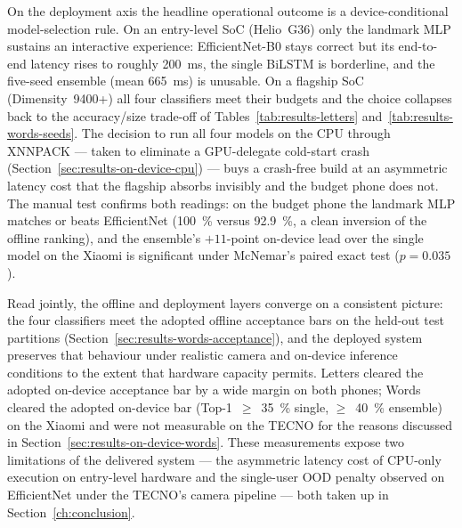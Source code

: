 On the deployment axis the headline operational outcome is a
device-conditional model-selection rule. On an entry-level SoC
(Helio~G36) only the landmark MLP sustains an interactive experience:
EfficientNet-B0 stays correct but its end-to-end latency rises to
roughly \SI{200}{ms}, the single BiLSTM is borderline, and the
five-seed ensemble (mean \SI{665}{ms}) is unusable. On a flagship SoC
(Dimensity~9400+) all four classifiers meet their budgets and the
choice collapses back to the accuracy/size trade-off of
Tables~\ref{tab:results-letters} and~\ref{tab:results-words-seeds}.
The decision to run all four models on the CPU through XNNPACK ---
taken to eliminate a GPU-delegate cold-start crash
(Section~\ref{sec:results-on-device-cpu}) --- buys a crash-free build
at an asymmetric latency cost that the flagship absorbs invisibly and
the budget phone does not. The manual test confirms both readings:
on the budget phone the landmark MLP matches or beats EfficientNet
(\SI{100}{\percent} versus \SI{92.9}{\percent}, a clean inversion of
the offline ranking), and the ensemble's $+11$-point on-device lead
over the single model on the Xiaomi is significant under McNemar's
paired exact test ($p = 0.035$).

Read jointly, the offline and deployment layers converge on a
consistent picture: the four classifiers meet the adopted offline
acceptance bars on the held-out test partitions
(Section~\ref{sec:results-words-acceptance}), and the deployed system
preserves that behaviour under realistic camera and on-device
inference conditions to the extent that hardware capacity permits.
Letters cleared the adopted on-device acceptance bar by a wide
margin on both phones; Words cleared the adopted on-device bar
(Top-1~$\geq$~\SI{35}{\percent} single,
$\geq$~\SI{40}{\percent} ensemble) on the Xiaomi and were not
measurable on the TECNO for the reasons discussed in
Section~\ref{sec:results-on-device-words}. These measurements expose
two limitations of the delivered system --- the asymmetric latency
cost of CPU-only execution on entry-level hardware and the
single-user OOD penalty observed on EfficientNet under the TECNO's
camera pipeline --- both taken up in Section~\ref{ch:conclusion}.
